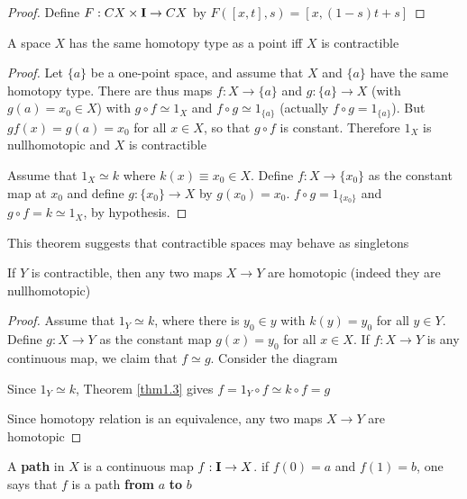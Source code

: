 \documentclass[11pt]{article}
\begin{document}
\begin{proof}
Define \(F:CX\times\operatorname{\textbf{I}}\to CX\) by \(F([x,t],s)=[x,(1-s)t+s]\)
\end{proof}

\begin{theorem}[]
A space \(X\) has the same homotopy type as a point iff \(X\) is contractible
\end{theorem}

\begin{proof}
Let \(\{a\}\) be a one-point space, and assume that \(X\) and \(\{a\}\) have the same homotopy type.
There are thus maps \(f:X\to\{a\}\) and \(g:\{a\}\to X\) (with \(g(a)=x_0\in X\)) with \(g\circ f\simeq 1_X\)
and \(f\circ g\simeq 1_{\{a\}}\) (actually \(f\circ g=1_{\{a\}}\)). But \(gf(x)=g(a)=x_0\) for all \(x\in X\), so
that \(g\circ f\) is constant. Therefore \(1_X\) is nullhomotopic and \(X\) is contractible

Assume that \(1_X\simeq k\) where \(k(x)\equiv x_0\in X\). Define \(f:X\to\{x_0\}\) as the constant map
at \(x_0\) and define \(g:\{x_0\}\to X\) by \(g(x_0)=x_0\). \(f\circ g=1_{\{x_0\}}\) and \(g\circ f=k\simeq 1_X\),
by hypothesis.
\end{proof}

This theorem suggests that contractible spaces may behave as singletons

\begin{theorem}[]
If \(Y\) is contractible, then any two maps \(X\to Y\) are homotopic (indeed they are nullhomotopic)
\end{theorem}

\begin{proof}
Assume that \(1_Y\simeq k\), where there is \(y_0\in y\) with \(k(y)=y_0\) for all \(y\in Y\).
Define \(g:X\to Y\) as the constant map \(g(x)=y_0\) for all \(x\in X\). If \(f:X\to Y\) is any
continuous map, we claim that \(f\simeq g\). Consider the diagram
\begin{center}\end{center}
Since \(1_Y\simeq k\), Theorem \ref{thm1.3} gives \(f=1_Y\circ f\simeq k\circ f=g\)

Since homotopy relation is an equivalence, any two maps \(X\to Y\) are homotopic
\end{proof}

\begin{definition}[]
A \textbf{path} in \(X\) is a continuous map \(f:\operatorname{\textbf{I}}\to X\). if \(f(0)=a\) and \(f(1)=b\), one says that \(f\)
is a path \textbf{from} \(a\) \textbf{to} \(b\)
\end{definition}
\end{document}

